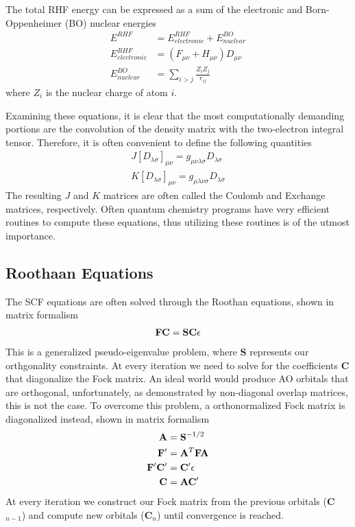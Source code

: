 \documentclass[aip,jcp,preprint,superscriptaddress,floatfix]{revtex4-1}
\begin{document}
The total RHF energy can be expressed as a sum of the electronic and Born-Oppenheimer (BO) nuclear energies
\begin{align}
E^{RHF} &= E^{RHF}_{electronic} + E^{BO}_{nuclear}\\
E^{RHF}_{electronic} &= (F_{\mu\nu} + H_{\mu\nu}) D_{\mu\nu}\\
E^{BO}_{nuclear} &= \sum_{i>j}\frac{Z_iZ_j}{r_{ij}}
\end{align}
where $Z_i$ is the nuclear charge of atom $i$.


Examining these equations, it is clear that the most computationally demanding portions are the convolution of the density matrix with the two-electron integral tensor.
Therefore, it is often convenient to define the following quantities
\begin{eqnarray}
J[D_{\lambda \sigma}]_{\mu \nu} =   g_{\mu \nu \lambda \sigma} D_{\lambda \sigma}\\
K[D_{\lambda \sigma}]_{\mu \nu} =   g_{\mu \lambda \nu \sigma} D_{\lambda \sigma} 
\end{eqnarray}
The resulting $J$ and $K$ matrices are often called the Coulomb and Exchange matrices, respectively.
Often quantum chemistry programs have very efficient routines to compute these equations, thus utilizing these routines is of the utmost importance.


\subsection{Roothaan Equations}
The SCF equations are often solved through the Roothan equations\cite{Levine:2000to}, shown in matrix formalism
\begin{eqnarray}
\label{roothan_eqn}
{\rm\bf FC} = {\rm\bf SC}\epsilon
\end{eqnarray}
This is a generalized pseudo-eigenvalue problem, where {\bf S} represents our orthgonality constraints.
At every iteration we need to solve for the coefficients {\bf C} that diagonalize the Fock matrix.
An ideal world would produce AO orbitals that are orthogonal, unfortunately, as demonstrated by non-diagonal overlap matrices, this is not the case.
To overcome this problem, a orthonormalized Fock matrix is diagonalized instead, shown in matrix formalism
\begin{align}
{\rm\bf A} &= {\rm\bf S}^{-1/2}\\
{\rm\bf F}' &= {\rm\bf A}^{T}{\rm\bf FA}\\
{\rm\bf F'C'} &= {\rm\bf C'}\epsilon\\
{\rm\bf C} &= {\rm\bf AC}'
\end{align}
At every iteration we construct our Fock matrix from the previous orbitals ({\bf C}$_{n-1}$) and compute new orbitals ({\bf C}$_{n}$) until convergence is reached.
\end{document}
